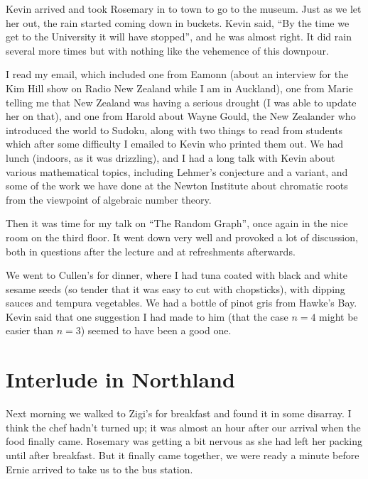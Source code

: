 \documentclass[12pt,a4paper]{article}
\begin{document}
Kevin arrived and took Rosemary in to town to go to the museum. Just as we
let her out, the rain started coming down in buckets. Kevin said, ``By the time
we get to the University it will have stopped'', and he was almost right. It
did rain several more times but with nothing like the vehemence of this
downpour.

I read my email, which included one from Eamonn (about an interview for the
Kim Hill show on Radio New Zealand while I am in Auckland), one from Marie
telling me that New Zealand was having a serious drought (I was able to update
her on that), and one from Harold about Wayne Gould, the New Zealander who
introduced the world to Sudoku, along with two things to read from students
which after some difficulty I emailed to Kevin who printed them out. We had
lunch (indoors, as it was drizzling), and I had a long talk with Kevin about
various mathematical topics, including Lehmer's conjecture and a variant, and
some of the work we have done at the Newton Institute about chromatic roots
from the viewpoint of algebraic number theory.

Then it was time for my talk on ``The Random Graph'', once again in the nice 
room on the third floor. It went down very well and provoked a lot of
discussion, both in questions after the lecture and at refreshments afterwards.

We went to Cullen's for dinner, where I had tuna coated with black and
white sesame seeds (so tender that it was easy to cut with chopsticks),
with dipping sauces and tempura vegetables. We had a bottle of pinot
gris from Hawke's Bay. Kevin said that one suggestion I had made to him
(that the case $n=4$ might be easier than $n=3$) seemed to have
been a good one.

\section{Interlude in Northland}

Next morning we walked to Zigi's for breakfast and found it in some disarray.
I think the chef hadn't turned up; it was almost an hour after our arrival
when the food finally came. Rosemary was getting a bit nervous as she had
left her packing until after breakfast. But it finally came together, we
were ready a minute before Ernie arrived to take us to the bus station.
\end{document}

